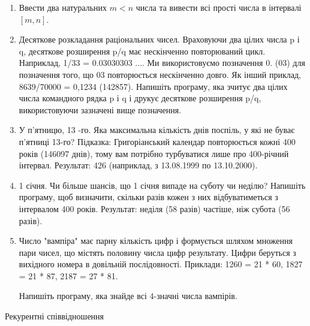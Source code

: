 \documentclass[]{article}
\begin{document}
\begin{enumerate}
\item
Ввести два натуральних $m<n$ числа та вивести всі прості числа в інтервалі $[m,n]$.

\item Десяткове розкладання раціональних чисел.
Враховуючи два цілих числа p і q, десяткове розширення p/q має нескінченно повторюваний цикл.
Наприклад, 1/33 = 0.03030303 .... Ми використовуємо позначення 0. (03) для позначення того, що 03 повторюється нескінченно довго.
Як інший приклад, 8639/70000 = 0,1234 (142857).
Напишіть програму, яка зчитує два цілих числа командного рядка p і q і друкує десяткове розширення p/q,
 використовуючи зазначені вище позначення. 

\item У п’ятницю, 13 -го. Яка максимальна кількість днів поспіль, у які не буває п’ятниці 13-го?
Підказка: Григоріанський календар повторюється кожні 400 років (146097 днів), тому вам потрібно турбуватися лише про 400-річний інтервал.
Результат: 426 (наприклад, з 13.08.1999 по 13.10.2000).
\item
 1 січня. Чи більше шансів, що 1 січня випаде на суботу чи неділю?
Напишіть програму, щоб визначити, скільки разів кожен з них відбуватиметься з інтервалом 400 років.
Результат: неділя (58 разів) частіше, ніж субота (56 разів).

\item
Число "вампіра" має парну кількість цифр і формується шляхом множення пари чисел, що містять половину числа цифр результату. Цифри беруться з вихідного номера в довільній послідовності. 
Приклади: 1260 = 21 * 60, 1827 = 21 * 87, 2187 = 27 * 81.

Напишіть програму, яка знайде всі 4-значні числа вампірів. 

\end{enumerate}

Рекурентні співвідношення
\end{document}

